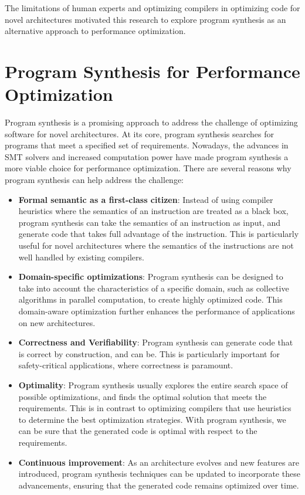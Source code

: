 The limitations of human experts and optimizing compilers in
optimizing code for novel architectures motivated this research
to explore program synthesis as an alternative approach to
performance optimization.

\section{Program Synthesis for Performance Optimization}

Program synthesis is a promising approach to address the challenge of
optimizing software for novel architectures.
%
At its core, program synthesis searches for programs that meet a
specified set of requirements.
%
Nowadays, the advances in SMT solvers and increased computation power
have made program synthesis a more viable choice for performance optimization.
%
There are several reasons why program synthesis can help address the
challenge:

\begin{itemize}
    \item \textbf{Formal semantic as a first-class citizen}: Instead
    of using compiler heuristics where the semantics of an instruction
    are treated as a black box, program synthesis can take the
    semantics of an instruction as input, and generate code that takes
    full advantage of the instruction. This is particularly useful for
    novel architectures where the semantics of the instructions are
    not well handled by existing compilers.

    \item \textbf{Domain-specific optimizations}: Program synthesis
    can be designed to take into account the characteristics of a
    specific domain, such as collective algorithms in parallel
    computation, to create highly optimized code.
    This domain-aware optimization further enhances the performance of
    applications on new architectures.

    \item \textbf{Correctness and Verifiability}: Program synthesis
    can generate code that is correct by construction, and can be.
    This is particularly important for safety-critical applications,
    where correctness is paramount.

    \item \textbf{Optimality}: Program synthesis usually explores the
    entire search space of possible optimizations, and finds the
    optimal solution that meets the requirements. This is in contrast
    to optimizing compilers that use heuristics to determine the best
    optimization strategies. With program synthesis, we can be sure
    that the generated code is optimal with respect to the
    requirements.

    \item \textbf{Continuous improvement}: As an architecture evolves
    and new features are introduced, program synthesis techniques can
    be updated to incorporate these advancements, ensuring that the
    generated code remains optimized over time.
\end{itemize}

